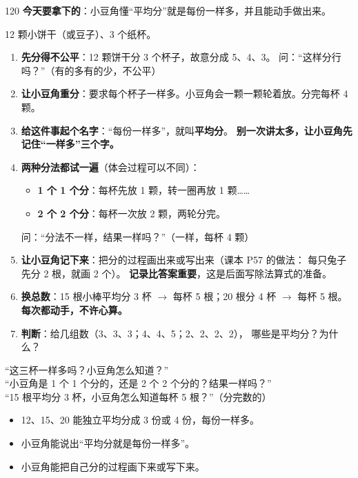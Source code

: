 \begin{lesson}{1}{20}
\textbf{今天要拿下的}：小豆角懂“平均分”就是每份一样多，并且能动手做出来。

\begin{materials}
12 颗小饼干（或豆子）、3 个纸杯。
\end{materials}

\begin{enumerate}
  \item \textbf{先分得不公平}：12 颗饼干分 3 个杯子，故意分成 5、4、3。
        问：“这样分行吗？”（有的多有的少，不公平）
  \item \textbf{让小豆角重分}：要求每个杯子一样多。小豆角会一颗一颗轮着放。分完每杯 4 颗。
  \item \textbf{给这件事起个名字}：“每份一样多”，就叫\textbf{平均分}。
        \textbf{别一次讲太多，让小豆角先记住“一样多”三个字。}
  \item \textbf{两种分法都试一遍}（体会过程可以不同）：
        \begin{itemize}
          \item \textbf{1 个 1 个分}：每杯先放 1 颗，转一圈再放 1 颗……
          \item \textbf{2 个 2 个分}：每杯一次放 2 颗，两轮分完。
        \end{itemize}
        问：“分法不一样，结果一样吗？”（一样，每杯 4 颗）
  \item \textbf{让小豆角记下来}：把分的过程画出来或写出来（课本 P57 的做法：
        每只兔子先分 2 根，就画 2 个）。
        \textbf{记录比答案重要}，这是后面写除法算式的准备。
  \item \textbf{换总数}：15 根小棒平均分 3 杯 $\to$ 每杯 5 根；20 根分 4 杯 $\to$ 每杯 5 根。
        \textbf{每次都动手，不许心算。}
  \item \textbf{判断}：给几组数（3、3、3；4、4、5；2、2、2、2），
        哪些是平均分？为什么？
\end{enumerate}

\begin{saybox}
“这三杯一样多吗？小豆角怎么知道？”\\
“小豆角是 1 个 1 个分的，还是 2 个 2 个分的？结果一样吗？”\\
“15 根平均分 3 杯，小豆角怎么知道每杯 5 根？”（分完数的）
\end{saybox}

\begin{passbox}
\begin{itemize}
  \item 12、15、20 能独立平均分成 3 份或 4 份，每份一样多。
  \item 小豆角能说出“平均分就是每份一样多”。
  \item 小豆角能把自己分的过程画下来或写下来。
\end{itemize}
\end{passbox}
\end{lesson}


